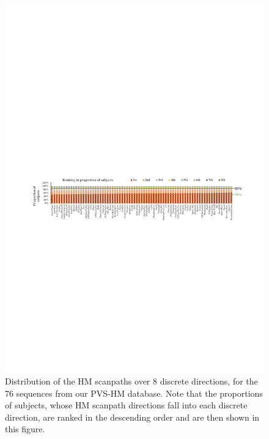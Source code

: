 \documentclass[10pt,journal,compsoc]{IEEEtran}
\begin{document}
\begin{figure}
\vspace{-1.5em}
	\begin{center}
		\centerline{\includegraphics[width=2\columnwidth]{figures/database/direction-consistence-distribution}}%
        \vspace{-1.5em}
		\caption{\footnotesize{Distribution of the HM scanpaths over 8 discrete directions, for the 76 sequences from our PVS-HM database. Note that the proportions of subjects, whose HM scanpath directions fall into each discrete direction, are ranked in the descending order and are then shown in this figure.}}
		\label{direction-consistence-distribution}
	\end{center}
\vspace{-2em}
\end{figure}
\end{document}
